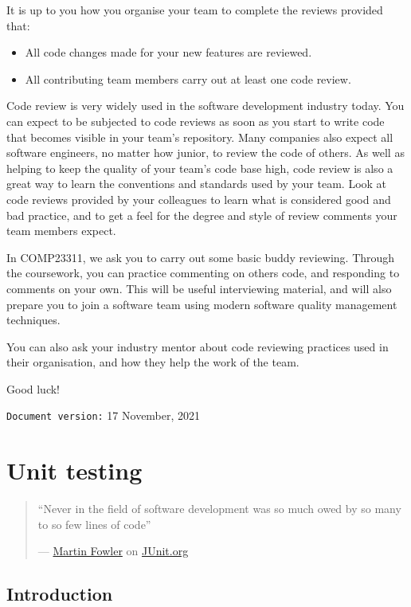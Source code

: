 \documentclass[
]{book}
\providecommand{\tightlist}{%
  \setlength{\itemsep}{0pt}\setlength{\parskip}{0pt}}
\begin{document}
It is up to you how you organise your team to complete the reviews provided that:

\begin{itemize}
\tightlist
\item
  All code changes made for your new features are reviewed.
\item
  All contributing team members carry out at least one code review.
\end{itemize}

Code review is very widely used in the software development industry today. You can expect to be subjected to code reviews as soon as you start to write code that becomes visible in your team's repository. Many companies also expect all software engineers, no matter how junior, to review the code of others. As well as helping to keep the quality of your team's code base high, code review is also a great way to learn the conventions and standards used by your team. Look at code reviews provided by your colleagues to learn what is considered good and bad practice, and to get a feel for the degree and style of review comments your team members expect.

In COMP23311, we ask you to carry out some basic buddy reviewing. Through the coursework, you can practice commenting on others code, and responding to comments on your own. This will be useful interviewing material, and will also prepare you to join a software team using modern software quality management techniques.

You can also ask your industry mentor about code reviewing practices used in their organisation, and how they help the work of the team.

Good luck!

\texttt{Document\ version:} 17 November, 2021

\hypertarget{automating}{%
\chapter{Unit testing}\label{automating}}

\begin{quote}
``Never in the field of software development was so much owed by so many to so few lines of code''

--- \href{https://en.wikipedia.org/wiki/Martin_Fowler_(software_engineer)}{Martin Fowler} on \href{https://junit.org/}{JUnit.org}
\end{quote}

\hypertarget{jintro}{%
\section{Introduction}\label{jintro}}
\end{document}

